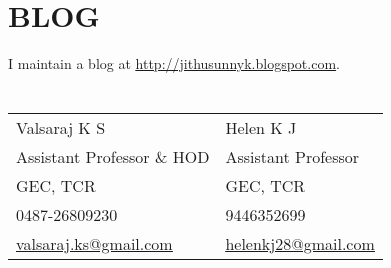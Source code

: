 \begin{resume}
\vspace*{+2mm}

\section{\sc \bf \textsf{BLOG}}
I maintain a blog at \href{http://jithusunnyk.blogspot.com}{\underline{http://jithusunnyk.blogspot.com}}.

\section{}
\vspace{.05in}
\begin{tabular}{@{}p{2in}p{4in}}
Valsaraj K S   &  Helen K J \\
Assistant Professor \& HOD   & Assistant Professor   \\
GEC, TCR   &  GEC, TCR  \\
0487-26809230 & 9446352699 \\
\href{mailto:valsaraj.ks@gmail.com}{\underline{valsaraj.ks@gmail.com}} & 
\href{mailto:helenkj28@gmail.com}{\underline{helenkj28@gmail.com}}
\end{tabular}

\end{resume}

